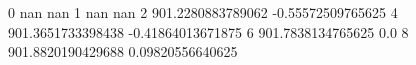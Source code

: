 0 nan nan
1 nan nan
2 901.2280883789062 -0.55572509765625
4 901.3651733398438 -0.41864013671875
6 901.7838134765625 0.0
8 901.8820190429688 0.09820556640625
